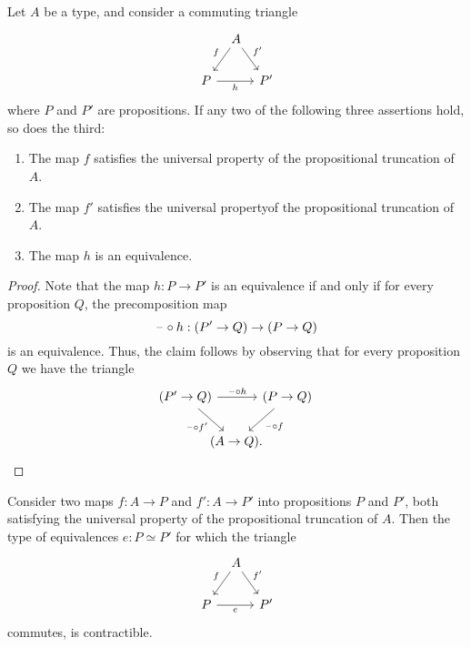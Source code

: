 \begin{prp}\label{prp:propositional-truncation-3-for-2}
  Let $A$ be a type, and consider a commuting triangle
  \begin{equation*}
    \begin{tikzcd}[column sep=tiny]
      \phantom{P'} & A \arrow[dl,swap,"f"] \arrow[dr,"{f'}"] \\
      P \arrow[rr,swap,"h"] & & P'
    \end{tikzcd}
  \end{equation*}
  where $P$ and $P'$ are propositions. If any two of the following three assertions hold, so does the third:
  \begin{enumerate}
  \item The map $f$ satisfies the universal property of the propositional truncation of $A$.
  \item The map $f'$ satisfies the universal propertyof the propositional truncation of $A$.
  \item The map $h$ is an equivalence.
  \end{enumerate}
\end{prp}

\begin{proof}
  Note that the map $h:P\to P'$ is an equivalence if and only if for every proposition $Q$, the precomposition map
  \begin{equation*}
    \mathord{\hspace{1pt}\text{--}\hspace{1pt}}\circ h:(P'\to Q)\to (P\to Q)
  \end{equation*}
  is an equivalence. Thus, the claim follows by observing that for every proposition $Q$ we have the triangle
  \begin{equation*}
    \begin{tikzcd}[column sep=-1em]
      (P'\to Q) \arrow[rr,"\blank\circ h"] \arrow[dr,swap,"\blank\circ {f'}"] & & (P\to Q) \arrow[dl,"\blank\circ f"] \\
      & (A\to Q). & \phantom{(P'\to Q)}
    \end{tikzcd}
  \end{equation*}
\end{proof}

\begin{cor}\label{cor:uniquely-unique-brck}
  Consider two maps $f:A\to P$ and $f':A\to P'$ into propositions $P$ and $P'$, both satisfying the universal property of the propositional truncation of $A$. Then the type of equivalences $e:P \simeq P'$ for which the triangle
  \begin{equation*}
    \begin{tikzcd}[column sep=tiny]
      \phantom{P'} & A \arrow[dl,swap,"f"] \arrow[dr,"{f'}"] \\
      P \arrow[rr,swap,"e"] & & P'
    \end{tikzcd}
  \end{equation*}
  commutes, is contractible.
\end{cor}

